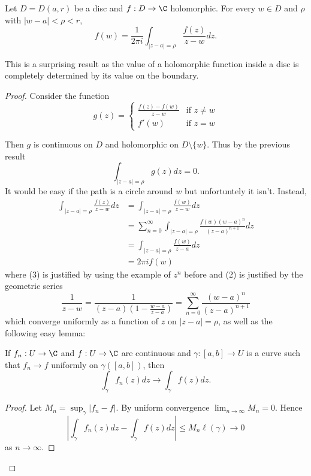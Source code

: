 \documentclass[a4paper]{article}
\begin{document}
\begin{theorem}
  \label{thm:Cauchy integral formula}
  Let \(D = D(a, r)\) be a disc and \(f: D \to \C\) holomorphic. For every \(w \in D\) and \(\rho\) with \(|w - a| < \rho < r\),
  \[
    f(w) = \frac{1}{2\pi i} \int_{|z - a| = \rho} \frac{f(z)}{z - w} dz.
  \]
\end{theorem}

This is a surprising result as the value of a holomorphic function inside a disc is completely determined by its value on the boundary.

\begin{proof}
  Consider the function
  \[
    g(z) =
    \begin{cases}
      \frac{f(z) - f(w)}{z - w} & \text{if } z \neq w \\
      f'(w) & \text{if } z = w
    \end{cases}
  \]

Then \(g\) is continuous on \(D\) and holomorphic on \(D \setminus \{w\}\). Thus by the previous result
\[
  \int_{|z - a| = \rho} g(z)dz = 0.
\]
It would be easy if the path is a circle around \(w\) but unfortuntely it isn't. Instead, 
\begin{align}
  \int_{|z - a| = \rho} \frac{f(z)}{z - w} dz
  &= \int_{|z - a| = \rho} \frac{f(w)}{z - w} dz \\
  &= \sum_{n = 0}^\infty \int_{|z - a| = \rho} \frac{f(w)(w - a)^n}{(z - a)^{n + 1}} dz \\
  &= \int_{|z - a| = \rho} \frac{f(w)}{z - a} dz \\
  &= 2\pi i f(w)
\end{align}
where (3) is justified by using the example of \(z^n\) before and (2) is justified by the geometric series
\[
  \frac{1}{z - w}
  = \frac{1}{(z - a)\left( 1- \frac{w - a}{z - a} \right)}
  = \sum_{n = 0}^\infty \frac{(w - a)^n}{(z - a)^{n + 1}}
\]
which converge uniformly as a function of \(z\) on \(|z - a| = \rho\), as well as the following easy lemma:

\begin{lemma}
  If \(f_n: U \to \C\) and \(f: U \to \C\) are continuous and \(\gamma: [a, b] \to U\) is a curve such that \(f_n \to f\) uniformly on \(\gamma([a, b])\), then
  \[
    \int_\gamma f_n(z)dz \to \int_\gamma f(z) dz.
  \]
\end{lemma}

\begin{proof}
  Let \(M_n = \sup_\gamma |f_n - f|\). By uniform convergence \(\lim_{n \to \infty} M_n = 0\). Hence
  \[
    \left| \int_\gamma f_n(z) dz - \int_\gamma f(z) dz \right|
    \leq M_n \ell(\gamma) \to 0
  \]
  as \(n \to \infty\).
\end{proof}
\end{proof}
\end{document}

